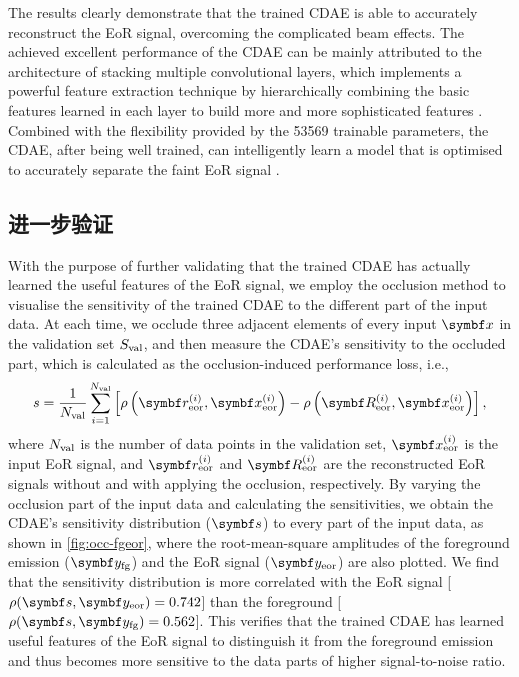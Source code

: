 The results clearly demonstrate that the trained CDAE is able to accurately
reconstruct the EoR signal, overcoming the complicated beam effects.
The achieved excellent performance of the CDAE can be mainly attributed
to the architecture of stacking multiple convolutional layers, which
implements a powerful feature extraction technique by hierarchically
combining the basic features learned in each layer to build more and
more sophisticated features \cite{lecun2015}.
Combined with the flexibility provided by the \num{53569} trainable
parameters, the CDAE, after being well trained, can intelligently learn a
model that is optimised to accurately separate the faint EoR signal
\cite{domingos2012}.

\subsection{进一步验证}

With the purpose of further validating that the trained CDAE has actually
learned the useful features of the EoR signal, we employ the occlusion
method \cite{zeiler2014} to visualise the sensitivity of the trained CDAE
to the different part of the input data.
At each time, we occlude three adjacent elements of every input
$\B{x}$ in the validation set $S_{\mathrm{val}}$, and then measure the CDAE's
sensitivity to the occluded part, which is calculated as the
occlusion-induced performance loss, i.e.,
\begin{equation}
  \label{eq:perf-loss}
  s = \frac{1}{N_{\R{val}}} \sum_{i=1}^{N_{\R{val}}} \left[
      \rho\left(\B{r}^{(i)}_{\R{eor}}, \B{x}^{(i)}_{\R{eor}}\right) -
      \rho\left(\B{R}^{(i)}_{\R{eor}}, \B{x}^{(i)}_{\R{eor}}\right)
    \right] ,
\end{equation}
where
$N_{\mathrm{val}}$ is the number of data points in the validation set,
$\B{x}^{(i)}_{\R{eor}}$ is the input EoR signal, and
$\B{r}^{(i)}_{\R{eor}}$ and $\B{R}^{(i)}_{\R{eor}}$ are the reconstructed
EoR signals without and with applying the occlusion, respectively.
By varying the occlusion part of the input data and calculating the
sensitivities, we obtain the CDAE's sensitivity distribution ($\B{s}$) to
every part of the input data, as shown in \autoref{fig:occ-fgeor}, where
the root-mean-square amplitudes of the foreground emission
($\B{y}_{\R{fg}}$) and the EoR signal ($\B{y}_{\R{eor}}$) are also plotted.
We find that the sensitivity distribution is more correlated with the EoR
signal [$\rho(\B{s}, \B{y}_{\R{eor}}) = 0.742$] than the foreground
[$\rho(\B{s}, \B{y}_{\R{fg}}) = 0.562$].
This verifies that the trained CDAE has learned useful features of the EoR
signal to distinguish it from the foreground emission and thus becomes more
sensitive to the data parts of higher signal-to-noise ratio.

